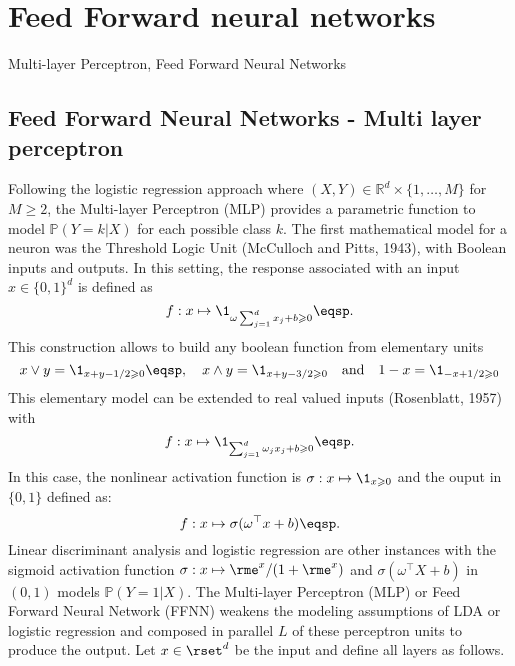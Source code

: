 \chapter{Feed Forward neural networks}
\minitoc
\begin{kwd}
Multi-layer Perceptron, Feed Forward Neural Networks
\end{kwd}



\section{Feed Forward Neural Networks - Multi layer perceptron} 

Following the logistic regression approach where $(X,Y)\in\mathbb{R}^d\times \{1,\ldots,M\}$ for $M\geqslant 2$, the Multi-layer Perceptron (MLP) provides a parametric function to model $\mathbb{P}(Y=k | X)$ for each possible class $k$.
The first  mathematical model for a neuron was the Threshold Logic Unit (McCulloch and Pitts, 1943), with Boolean inputs and outputs. In this setting, the response associated with an input $x\in\{0,1\}^d$ is defined as 
$$
f: x\mapsto \1_{\omega\sum_{j=1}^dx_j + b \geqslant 0}\eqsp.
$$ 
This construction allows to build any boolean function from elementary units
\[
x\vee y = \1_{x+y-1/2 \geqslant 0}\eqsp,\quad x\wedge y = \1_{x+y-3/2 \geqslant 0}\quad\mathrm{and}\quad  1-x = \1_{-x+1/2 \geqslant 0}
\] 
This elementary model can be extended to real valued inputs (Rosenblatt, 1957) with 
$$
f: x\mapsto \1_{\sum_{j=1}^d\omega_jx_j + b \geqslant 0}\eqsp.
$$
In this case, the nonlinear activation function is $\sigma: x \mapsto \1_{x\geqslant 0}$ and the ouput in $\{0,1\}$ defined as:
\[
f:x \mapsto \sigma(\omega^\top x + b)\eqsp.
\]
Linear discriminant analysis and logistic regression are other instances with the sigmoid activation function $\sigma: x\mapsto \rme^x/(1+\rme^x)$ and  $ \sigma(\omega^\top X + b)$ in $(0,1)$ models $\mathbb{P}(Y=1 | X)$.
The Multi-layer Perceptron (MLP) or Feed Forward Neural Network (FFNN) weakens the modeling assumptions of LDA or logistic regression and composed in parallel  $L$ of these perceptron units to produce the output. Let $x\in\rset^d$ be the input and define all layers as follows.
